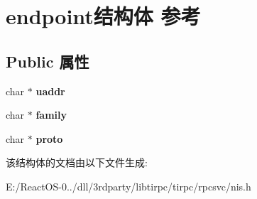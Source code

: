 \hypertarget{structendpoint}{}\section{endpoint结构体 参考}
\label{structendpoint}
\subsection*{Public 属性}
\begin{DoxyCompactItemize}
\item 
\mbox{\label{structendpoint_a62446939a846390cdffa513e136745cd}} 
char $\ast$ {\bfseries uaddr}
\item 
\mbox{\label{structendpoint_a930011f899deb90613d2a79dbf2e37e8}} 
char $\ast$ {\bfseries family}
\item 
\mbox{\label{structendpoint_a5e5e2b9b8c38d08b0daa28730dda8243}} 
char $\ast$ {\bfseries proto}
\end{DoxyCompactItemize}


该结构体的文档由以下文件生成\+:\begin{DoxyCompactItemize}
\item 
E\+:/\+React\+O\+S-\/0../dll/3rdparty/libtirpc/tirpc/rpcsvc/nis.\+h\end{DoxyCompactItemize}
